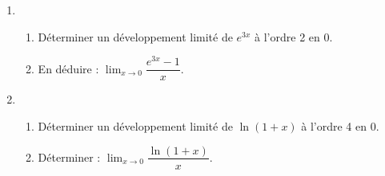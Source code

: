 
\begin{exercice}\label{exoautoanalyseCTU-40}

\begin{enumerate}
\item \begin{enumerate}
\item Déterminer un développement limité de $e^{3x}$ à l'ordre 2 en 0.
\item En déduire  : $\displaystyle \lim_{x\to 0}\dfrac{e^{3x}-1}{x}.$
\end{enumerate}
\item \begin{enumerate}
\item Déterminer un développement limité de $\ln(1+x)$ à l'ordre 4 en 0.
\item  Déterminer :  $\displaystyle \lim_{x\to0}\dfrac{\ln (1+x)}{x}$.

\end{enumerate}
\end{enumerate}

\end{exercice}
